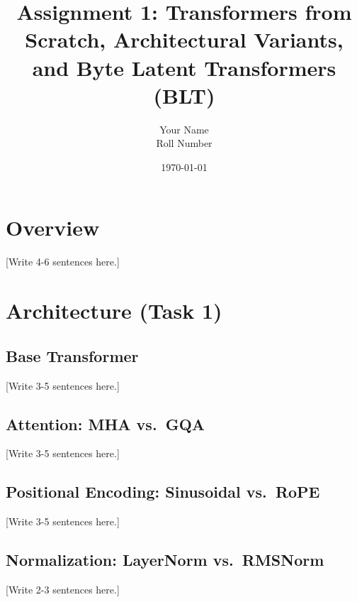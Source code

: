 \documentclass[12pt]{article}
\title{Assignment 1: Transformers from Scratch, Architectural Variants,\\ and Byte Latent Transformers (BLT)}
\author{Your Name \\ Roll Number}
\date{\today}
\begin{document}
\maketitle

\section{Overview}
[Write 4-6 sentences here.]

\section{Architecture (Task 1)}

\subsection{Base Transformer}
[Write 3-5 sentences here.]

\subsection{Attention: MHA vs.\ GQA}
[Write 3-5 sentences here.]

\subsection{Positional Encoding: Sinusoidal vs.\ RoPE}
[Write 3-5 sentences here.]

\subsection{Normalization: LayerNorm vs.\ RMSNorm}
[Write 2-3 sentences here.]
\end{document}

